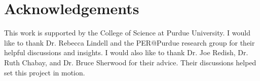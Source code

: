 \chapter[Acknowledgements]{Acknowledgements}

This work is supported by the College of Science at Purdue University. I would like to thank Dr. Rebecca Lindell and the PER@Purdue research group for their helpful discussions and insights. I would also like to thank Dr. Joe Redish, Dr. Ruth Chabay, and Dr. Bruce Sherwood for their advice. Their discussions helped set this project in motion.